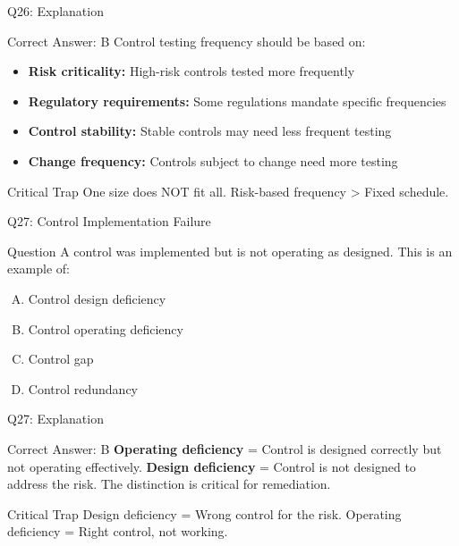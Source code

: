 \documentclass{beamer}
\begin{document}
	\begin{frame}{Q26: Explanation}
		\begin{block}{Correct Answer: B}
			Control testing frequency should be based on:
			\begin{itemize}
				\item \textbf{Risk criticality:} High-risk controls tested more frequently
				\item \textbf{Regulatory requirements:} Some regulations mandate specific frequencies
				\item \textbf{Control stability:} Stable controls may need less frequent testing
				\item \textbf{Change frequency:} Controls subject to change need more testing
			\end{itemize}
		\end{block}
		\begin{alertblock}{Critical Trap}
			One size does NOT fit all.
			Risk-based frequency > Fixed schedule.
		\end{alertblock}
	\end{frame}
	
	\begin{frame}{Q27: Control Implementation Failure}
		\begin{block}{Question}
			A control was implemented but is not operating as designed. This is an example of:
		\end{block}
		\begin{enumerate}[(A)]
			\item Control design deficiency
			\item Control operating deficiency
			\item Control gap
			\item Control redundancy
		\end{enumerate}
	\end{frame}
	
	\begin{frame}{Q27: Explanation}
		\begin{block}{Correct Answer: B}
			\textbf{Operating deficiency} = Control is designed correctly but not operating effectively. \textbf{Design deficiency} = Control is not designed to address the risk. The distinction is critical for remediation.
		\end{block}
		\begin{alertblock}{Critical Trap}
			Design deficiency = Wrong control for the risk.
			Operating deficiency = Right control, not working.
		\end{alertblock}
	\end{frame}
	
\end{document}
